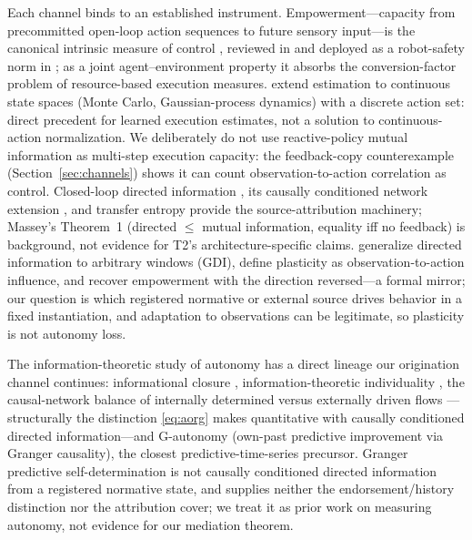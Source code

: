 Each channel binds to an established instrument. Empowerment---capacity from
precommitted open-loop action sequences to future sensory input---is the
canonical intrinsic measure of control \citep{klyubin2005}, reviewed in
\citet{salge2013} and deployed as a robot-safety norm in
\citet{salge_polani2017}; as a joint agent--environment property it absorbs
the conversion-factor problem of resource-based execution measures.
\citet{jung2011continuous} extend estimation to continuous state spaces
(Monte Carlo, Gaussian-process dynamics) with a discrete action set: direct
precedent for learned execution estimates, not a solution to continuous-action
normalization. We deliberately do not use reactive-policy mutual information
as multi-step execution capacity: the feedback-copy counterexample
(Section~\ref{sec:channels}) shows it can count observation-to-action
correlation as control. Closed-loop directed information
\citep{massey1990}, its causally conditioned network extension
\citep{kramer2003}, and transfer entropy \citep{schreiber2000} provide the
source-attribution machinery; Massey's Theorem~1 (directed $\le$ mutual
information, equality iff no feedback) is background, not evidence for T2's
architecture-specific claims. \citet{abel2025plasticity} generalize directed
information to arbitrary windows (GDI), define plasticity as
observation-to-action influence, and recover empowerment with the direction
reversed---a formal mirror; our question is which registered normative or
external source drives behavior in a fixed instantiation, and adaptation to
observations can be legitimate, so plasticity is not autonomy loss.

The information-theoretic study of autonomy has a direct lineage our
origination channel continues: informational closure
\citep{bertschinger2008}, information-theoretic individuality
\citep{krakauer2020}, the causal-network balance of internally determined
versus externally driven flows \citep{ay_polani2008}---structurally the
distinction \eqref{eq:aorg} makes quantitative with causally conditioned
directed information---and G-autonomy \citep{seth2010} (own-past predictive
improvement via Granger causality), the closest predictive-time-series
precursor. Granger predictive self-determination is not causally conditioned
directed information from a registered normative state, and supplies neither
the endorsement/history distinction nor the attribution cover; we treat it as
prior work on measuring autonomy, not evidence for our mediation theorem.

